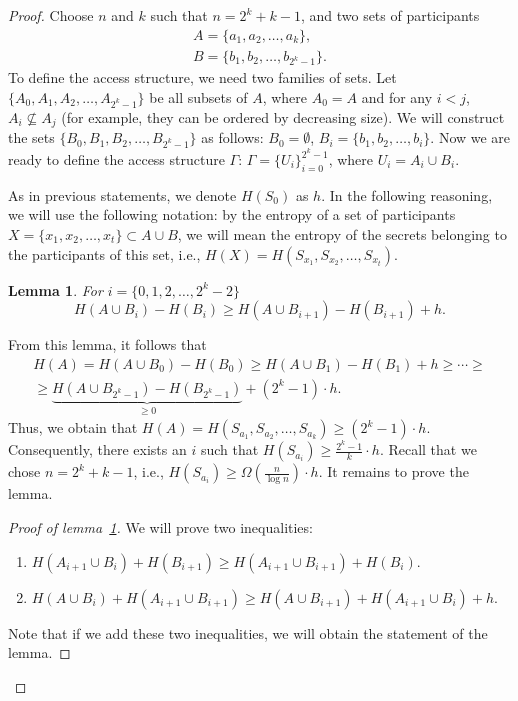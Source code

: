 \documentclass[12pt,sans]{article}
\newcommand{\seqn}[2]{{#1}_1,{#1}_2,\dotsc,{#1}_{#2}}
\newcommand{\seqin}[3]{{#1}_{{#2}_1},{#1}_{{#2}_2},\dotsc,{#1}_{{#2}_{#3}}}
\theoremstyle{definition}
\theoremstyle{plain}
\newtheorem{lemma}{Lemma}[section]
\theoremstyle{remark}
\begin{document}
\begin{proof}
    Choose $n$ and $k$ such that $n = 2^k + k - 1$, and two sets of participants
    \[
    \begin{array}{l}
        A = \{\seqn{a}{k}\},\\
        B = \{\seqn{b}{2^k - 1}\}.
    \end{array}
    \]
    To define the access structure, we need two families of sets. Let $\{A_0, \seqn{A}{2^k-1}\}$ be all subsets of $A$, where $A_0 = A$ and for any $i < j$, $A_i \not\subseteq A_j$ (for example, they can be ordered by decreasing size). We will construct the sets $\{B_0, \seqn{B}{2^k - 1}\}$ as follows: $B_0 = \emptyset$, $B_i = \{\seqn{b}{i}\}$. Now we are ready to define the access structure $\Gamma$: $\Gamma = \{U_i\}_{i=0}^{2^k-1}$, where $U_i = A_i \cup B_i$.

    As in previous statements, we denote $H(S_0)$ as $h$. In the following reasoning, we will use the following notation: by the entropy of a set of participants $X = \{\seqn{x}{t}\} \subset A \cup B$, we will mean the entropy of the secrets belonging to the participants of this set, i.e., $H(X) = H(\seqin{S}{x}{t})$.

    \begin{lemma}\label{lm:secretlb}
        For $i = \{0, 1, 2, \dots, 2^k-2\}$
        \[
        H(A \cup B_i) - H(B_i) \ge H(A \cup B_{i+1}) - H(B_{i+1}) + h.
        \]
    \end{lemma}

    From this lemma, it follows that
    \begin{multline*}
        H(A) = H(A \cup B_0) - H(B_0) \ge H(A \cup B_{1}) - H(B_1) + h \ge \dotsb \ge\\
        \ge \underbrace{H(A \cup B_{2^k-1}) - H(B_{2^k-1})}_{\ge 0} + (2^k - 1) \cdot h.
    \end{multline*}
    Thus, we obtain that $H(A) = H(\seqin{S}{a}{k}) \ge (2^k - 1) \cdot h$. Consequently, there exists an $i$ such that $H(S_{a_i}) \ge \frac{2^k - 1}{k} \cdot h$.
    Recall that we chose $n = 2^k + k - 1$, i.e., $H(S_{a_i}) \ge \Omega\left(\frac{n}{\log n}\right) \cdot h$. It remains to prove the lemma.

    \begin{proof}[Proof of lemma~\ref{lm:secretlb}]
        We will prove two inequalities:
        \begin{enumerate}
            \item $H(A_{i+1} \cup B_i) + H(B_{i+1}) \ge H(A_{i+1} \cup B_{i+1}) + H(B_i)$.
            \item $H(A \cup B_i) + H(A_{i+1} \cup B_{i+1}) \ge H(A \cup B_{i+1}) + H(A_{i+1} \cup B_i) + h$.
        \end{enumerate}
        Note that if we add these two inequalities, we will obtain the statement of the lemma.


\end{proof}
\end{proof}
\end{document}
